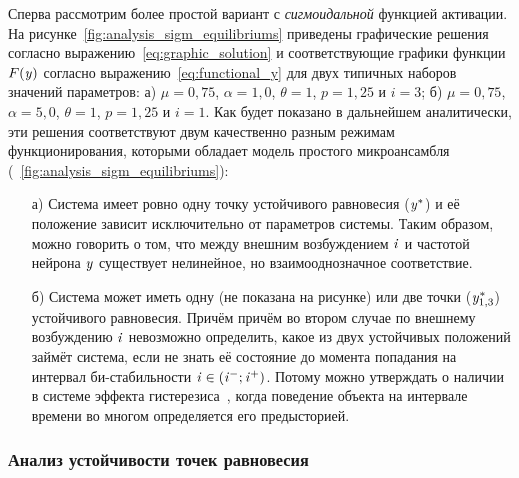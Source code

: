 Сперва рассмотрим более простой вариант с \textit{сигмоидальной} функцией активации. На рисунке~\ref{fig:analysis_sigm_equilibriums} приведены графические решения согласно выражению~\eqref{eq:graphic_solution} и соответствующие графики функции $F(\mathit{y})$ согласно выражению~\eqref{eq:functional_y} для двух типичных наборов значений параметров: а) $\mu = 0,75$, $\alpha = 1,0$, $\theta = 1$, $p = 1,25$ и $i = 3$; б) $\mu = 0,75$, $\alpha = 5,0$, $\theta = 1$, $p = 1,25$ и $i = 1$.
Как будет показано в дальнейшем аналитически, эти решения соответствуют двум качественно разным режимам функционирования, которыми обладает модель простого микроансамбля (\seefigure~\ref{fig:analysis_sigm_equilibriums}):
\begin{itemize}
    \item[а)] Система имеет ровно одну точку устойчивого равновесия ($\mathit{y}^{*}$) и её положение зависит исключительно от параметров системы. Таким образом, можно говорить о том, что между внешним возбуждением $\mathit{i}$ и частотой нейрона $\mathit{y}$ существует нелинейное, но взаимооднозначное соответствие.
    \item[б)] Система может иметь одну (не показана на рисунке) или две точки ($\mathit{y}_{1,3}^{*}$) устойчивого равновесия. Причём причём во втором случае по внешнему возбуждению $\mathit{i}$ невозможно определить, какое из двух устойчивых положений займёт система, если не знать её состояние до момента попадания на интервал би-стабильности $\mathit{i} \in (\mathit{i}^{-}; \mathit{i}^{+})$. Потому можно утверждать о наличии в системе эффекта гистерезиса~\cite{Krasnoselsky1983}, когда поведение объекта на интервале времени во многом определяется его предысторией.
\end{itemize}

\subsubsection{Анализ устойчивости точек равновесия}

